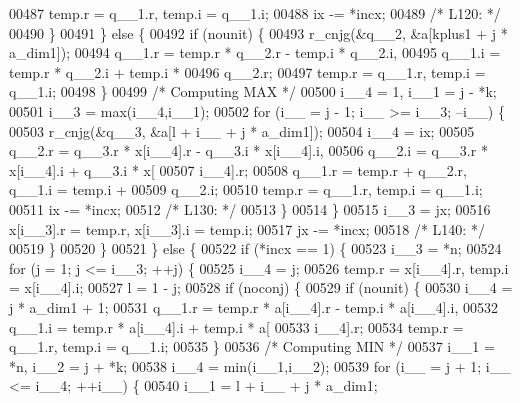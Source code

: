 \begin{DoxyCode}
00487                 temp.r = q\_\_1.r, temp.i = q\_\_1.i;
00488                 ix -= *incx;
00489 \textcolor{comment}{/* L120: */}
00490             \}
00491             \} \textcolor{keywordflow}{else} \{
00492             \textcolor{keywordflow}{if} (nounit) \{
00493                 r\_cnjg(&q\_\_2, &a[kplus1 + j * a\_dim1]);
00494                 q\_\_1.r = temp.r * q\_\_2.r - temp.i * q\_\_2.i, 
00495                     q\_\_1.i = temp.r * q\_\_2.i + temp.i * 
00496                     q\_\_2.r;
00497                 temp.r = q\_\_1.r, temp.i = q\_\_1.i;
00498             \}
00499 \textcolor{comment}{/* Computing MAX */}
00500             i\_\_4 = 1, i\_\_1 = j - *k;
00501             i\_\_3 = max(i\_\_4,i\_\_1);
00502             \textcolor{keywordflow}{for} (i\_\_ = j - 1; i\_\_ >= i\_\_3; --i\_\_) \{
00503                 r\_cnjg(&q\_\_3, &a[l + i\_\_ + j * a\_dim1]);
00504                 i\_\_4 = ix;
00505                 q\_\_2.r = q\_\_3.r * x[i\_\_4].r - q\_\_3.i * x[i\_\_4].i, 
00506                     q\_\_2.i = q\_\_3.r * x[i\_\_4].i + q\_\_3.i * x[
00507                     i\_\_4].r;
00508                 q\_\_1.r = temp.r + q\_\_2.r, q\_\_1.i = temp.i + 
00509                     q\_\_2.i;
00510                 temp.r = q\_\_1.r, temp.i = q\_\_1.i;
00511                 ix -= *incx;
00512 \textcolor{comment}{/* L130: */}
00513             \}
00514             \}
00515             i\_\_3 = jx;
00516             x[i\_\_3].r = temp.r, x[i\_\_3].i = temp.i;
00517             jx -= *incx;
00518 \textcolor{comment}{/* L140: */}
00519         \}
00520         \}
00521     \} \textcolor{keywordflow}{else} \{
00522         \textcolor{keywordflow}{if} (*incx == 1) \{
00523         i\_\_3 = *n;
00524         \textcolor{keywordflow}{for} (j = 1; j <= i\_\_3; ++j) \{
00525             i\_\_4 = j;
00526             temp.r = x[i\_\_4].r, temp.i = x[i\_\_4].i;
00527             l = 1 - j;
00528             \textcolor{keywordflow}{if} (noconj) \{
00529             \textcolor{keywordflow}{if} (nounit) \{
00530                 i\_\_4 = j * a\_dim1 + 1;
00531                 q\_\_1.r = temp.r * a[i\_\_4].r - temp.i * a[i\_\_4].i, 
00532                     q\_\_1.i = temp.r * a[i\_\_4].i + temp.i * a[
00533                     i\_\_4].r;
00534                 temp.r = q\_\_1.r, temp.i = q\_\_1.i;
00535             \}
00536 \textcolor{comment}{/* Computing MIN */}
00537             i\_\_1 = *n, i\_\_2 = j + *k;
00538             i\_\_4 = min(i\_\_1,i\_\_2);
00539             \textcolor{keywordflow}{for} (i\_\_ = j + 1; i\_\_ <= i\_\_4; ++i\_\_) \{
00540                 i\_\_1 = l + i\_\_ + j * a\_dim1;

\end{DoxyCode}
